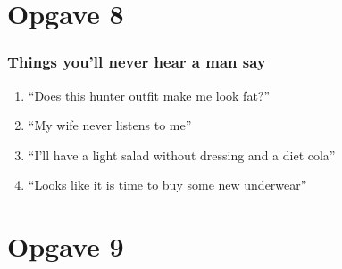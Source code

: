 \documentclass{beamer}
\begin{document}
\section{Opgave 8}

\begin{frame}
	\frametitle{Things you'll never 	hear a man say}
	
	\begin{enumerate}
		\item ``Does this hunter outfit make me look fat?'' \pause
		\item ``My wife never listens to me'' \pause
		\item ``I'll have a light salad without dressing and a diet cola'' \pause
		\item ``Looks like it is time to buy some new underwear'' \pause
	\end{enumerate}
\end{frame} 


\section{Opgave 9}
\end{document}
